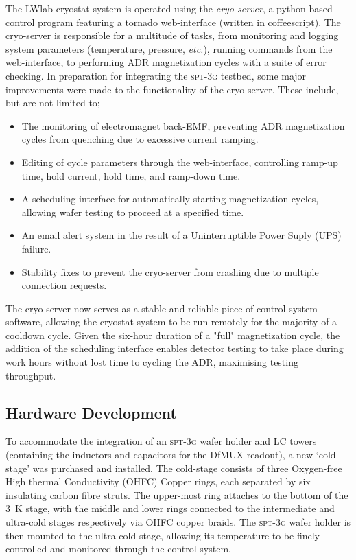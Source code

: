 \documentclass[iop]{emulateapj}
\begin{document}
The LWlab cryostat system is operated using the \textit{cryo-server}, a python-based control program featuring a tornado web-interface (written in coffeescript).  The cryo-server is responsible for a multitude of tasks, from monitoring and logging system parameters (temperature, pressure, \textit{etc.}), running commands from the web-interface, to performing ADR magnetization cycles with a suite of error checking.  In preparation for integrating the \textsc{spt-3g} testbed, some major improvements were made to the functionality of the cryo-server.  These include, but are not limited to;
\begin{itemize}[noitemsep,nolistsep]
	\item The monitoring of electromagnet back-EMF, preventing ADR magnetization cycles from quenching due to excessive current ramping.
	\item Editing of cycle parameters through the web-interface, controlling ramp-up time, hold current, hold time, and ramp-down time.
	\item A scheduling interface for automatically starting magnetization cycles, allowing wafer testing to proceed at a specified time.
	\item An email alert system in the result of a Uninterruptible Power Suply (UPS) failure.
	\item Stability fixes to prevent the cryo-server from crashing due to multiple connection requests.
\end{itemize}
The cryo-server now serves as a stable and reliable piece of control system software, allowing the cryostat system to be run remotely for the majority of a cooldown cycle.  Given the six-hour duration of a "full" magnetization cycle, the addition of the scheduling interface enables detector testing to take place during work hours without lost time to cycling the ADR, maximising testing throughput.

\subsection{Hardware Development}

To accommodate the integration of an \textsc{spt-3g} wafer holder and LC towers (containing the inductors and capacitors for the DfMUX readout), a new `cold-stage' was purchased and installed.  The cold-stage consists of three Oxygen-free High thermal Conductivity (OHFC) Copper rings, each separated by six insulating carbon fibre struts.  The upper-most ring attaches to the bottom of the 3~K stage, with the middle and lower rings connected to the intermediate and ultra-cold stages respectively via OHFC copper braids.  The \textsc{spt-3g} wafer holder is then mounted to the ultra-cold stage, allowing its temperature to be finely controlled and monitored through the control system.
\end{document}
